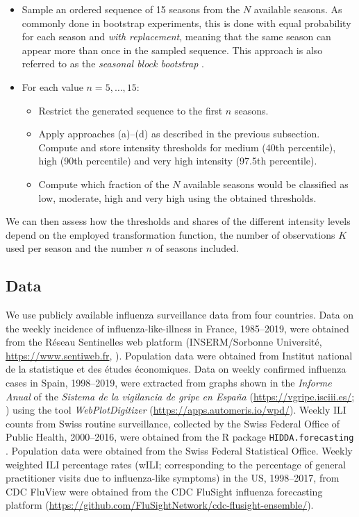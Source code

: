 \documentclass{article}
\begin{document}
\begin{itemize}
\item Sample an ordered sequence of 15 seasons from the $N$ available seasons. As commonly done in bootstrap experiments, this is done with equal probability for each season and \textit{with replacement}, meaning that the same season can appear more than once in the sampled sequence. This approach is also referred to as the \textit{seasonal block bootstrap} \citep{Politis2001}.
\item For each value $n = 5, \dots, 15$:
\begin{itemize}
\item Restrict the generated sequence to the first $n$ seasons.
\item Apply approaches (a)--(d) as described in the previous subsection. Compute and store intensity thresholds for medium (40th percentile), high (90th percentile) and very high intensity (97.5th percentile).
\item Compute which fraction of the $N$ available seasons would be classified as low, moderate, high and very high using the obtained thresholds.
\end{itemize}
\end{itemize}
We can then assess how the thresholds and shares of the different intensity levels depend on the employed transformation function, the number of observations $K$ used per season and the number $n$ of seasons included.

\subsection{Data}

We use publicly available influenza surveillance data from four countries. Data on the weekly incidence of influenza-like-illness in France, 1985--2019, were obtained from the Réseau Sentinelles web platform (INSERM/Sorbonne Université, \url{https://www.sentiweb.fr}, \citealt{Flahault2006}). Population data were obtained from Institut national de la statistique et des études économiques. Data on weekly confirmed influenza cases in Spain, 1998--2019, were extracted from graphs shown in the \textit{Informe Anual} of the \textit{Sistema de la vigilancia de gripe en Espa\~na} (\url{https://vgripe.isciii.es/}; \citealt{SVGE2019}) using the tool \textit{WebPlotDigitizer} (\url{https://apps.automeris.io/wpd/}). Weekly ILI counts from Swiss routine surveillance, collected by the Swiss Federal Office of Public Health, 2000--2016, were obtained from the R package \texttt{HIDDA.forecasting} \citep{Held2019}. Population data were obtained from the Swiss Federal Statistical Office. Weekly weighted ILI percentage rates (wILI; corresponding to the percentage of general practitioner visits due to influenza-like symptoms) in the US, 1998--2017, from CDC FluView \cite{Charbonneau2019} were obtained from the CDC FluSight influenza forecasting platform (\url{https://github.com/FluSightNetwork/cdc-flusight-ensemble/}). 
\end{document}
